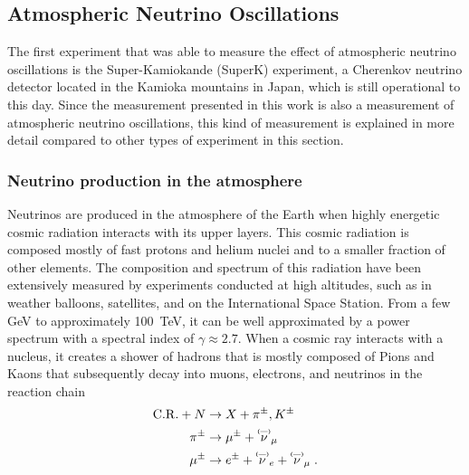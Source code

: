 \subsection{Atmospheric Neutrino Oscillations}
The first experiment that was able to measure the effect of atmospheric neutrino oscillations is the Super-Kamiokande (SuperK) experiment\cite{PhysRevLett.81.1562}, a Cherenkov neutrino detector located in the Kamioka mountains in Japan, which is still operational to this day.
Since the measurement presented in this work is also a measurement of atmospheric neutrino oscillations, this kind of measurement is explained in more detail compared to other types of experiment in this section.

\subsubsection{Neutrino production in the atmosphere}
Neutrinos are produced in the atmosphere of the Earth when highly energetic cosmic radiation interacts with its upper layers.
This cosmic radiation is composed mostly of fast protons and helium nuclei and to a smaller fraction of other elements.
The composition and spectrum of this radiation have been extensively measured by experiments conducted at high altitudes, such as in weather balloons, satellites, and on the International Space Station.
From a few GeV to approximately \SI{100}{TeV}, it can be well approximated by a power spectrum with a spectral index of $\gamma \approx 2.7$.
When a cosmic ray interacts with a nucleus, it creates a shower of hadrons that is mostly composed of Pions and Kaons that subsequently decay into muons, electrons, and neutrinos in the reaction chain
\begin{equation}
    \begin{aligned}
        \mathrm{C.R.} + N & \rightarrow X + \pi^\pm, K^\pm \\
        \pi^\pm & \rightarrow \mu^\pm + \pbar{\nu}_\mu \\
        \mu^\pm & \rightarrow e^\pm + \pbar{\nu}_e + \pbar{\nu}_\mu\;.
    \end{aligned}
\end{equation}
